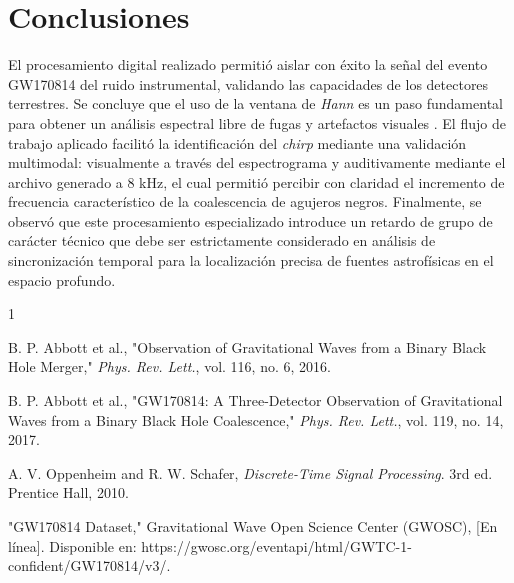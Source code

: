 \documentclass[lettersize,journal]{IEEEtran}
\begin{document}
\section{Conclusiones}
El procesamiento digital realizado permitió aislar con éxito la señal del evento GW170814 del ruido instrumental, validando las capacidades de los detectores terrestres. Se concluye que el uso de la ventana de \textit{Hann} es un paso fundamental para obtener un análisis espectral libre de fugas y artefactos visuales \cite{oppenheim}. El flujo de trabajo aplicado facilitó la identificación del \textit{chirp} mediante una validación multimodal: visualmente a través del espectrograma y auditivamente mediante el archivo generado a 8 kHz, el cual permitió percibir con claridad el incremento de frecuencia característico de la coalescencia de agujeros negros. Finalmente, se observó que este procesamiento especializado introduce un retardo de grupo de carácter técnico que debe ser estrictamente considerado en análisis de sincronización temporal para la localización precisa de fuentes astrofísicas en el espacio profundo.




\begin{thebibliography}{1}

B. P. Abbott et al., "Observation of Gravitational Waves from a Binary Black Hole Merger," \textit{Phys. Rev. Lett.}, vol. 116, no. 6, 2016.

B. P. Abbott et al., "GW170814: A Three-Detector Observation of Gravitational Waves from a Binary Black Hole Coalescence," \textit{Phys. Rev. Lett.}, vol. 119, no. 14, 2017.

A. V. Oppenheim and R. W. Schafer, \textit{Discrete-Time Signal Processing}. 3rd ed. Prentice Hall, 2010.

"GW170814 Dataset," Gravitational Wave Open Science Center (GWOSC), [En línea]. Disponible en: https://gwosc.org/eventapi/html/GWTC-1-confident/GW170814/v3/.

\end{thebibliography}


\newpage





\vfill
\end{document}
